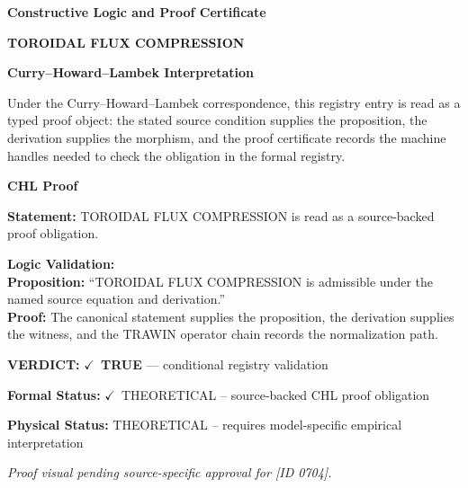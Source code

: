 \clearpage
\begingroup\tzpsupportsetup
\noindent\textbf{\fontsize{10.8pt}{12.8pt}\selectfont [ID 0704] Constructive Logic and Proof Certificate}\par
\noindent\textbf{\fontsize{10pt}{12pt}\selectfont TOROIDAL FLUX COMPRESSION}\par
\vspace{0.45em}
\begingroup
\footnotesize
\setlength{\parskip}{0.22em}
\setlength{\parindent}{0pt}
\noindent\textbf{Curry--Howard--Lambek Interpretation}\par
Under the Curry--Howard--Lambek correspondence, this registry entry is read as a typed proof
object: the stated source condition supplies the proposition, the derivation supplies the
morphism, and the proof certificate records the machine handles needed to check the obligation
in the formal registry.

\vspace{0.45em}
\noindent\textbf{CHL Proof}\par
\textbf{Statement:} TOROIDAL FLUX COMPRESSION is read as a source-backed proof obligation.

\textbf{Logic Validation:}\\
\textbf{Proposition:} ``TOROIDAL FLUX COMPRESSION is admissible under the named source equation and derivation.''\\
\textbf{Proof:} The canonical statement supplies the proposition, the derivation supplies the witness, and the TRAWIN operator chain records the normalization path.

\textbf{VERDICT:} \ensuremath{\checkmark}\ \textbf{TRUE} --- conditional registry validation

\textbf{Formal Status:} \ensuremath{\checkmark}\ THEORETICAL -- source-backed CHL proof obligation

\textbf{Physical Status:} THEORETICAL -- requires model-specific empirical interpretation
\par\vspace{0.45em}
\par
\vfill
\begingroup\footnotesize\itshape
Proof visual pending source-specific approval for [ID 0704].
\par\endgroup
\vfill
\endgroup
\endgroup
